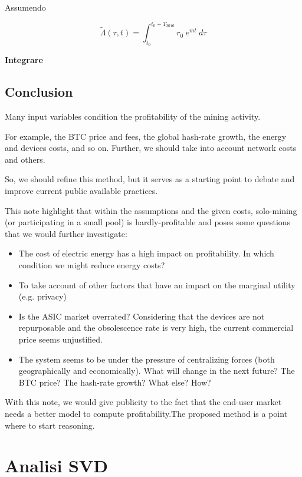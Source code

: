 \documentclass{book}
\theoremstyle{definition}
\begin{document}
Assumendo

\begin{equation}
    \tilde{\Lambda}(\tau, t) = \int_{t_{0}}^{t_{0} + T_{2016}} r_{0} \ e^{m t} \ d\tau
\end{equation}

\textbf{Integrare}

\newpage

\section{Conclusion}

Many input variables condition the profitability of the mining activity.

For example, the BTC price and fees, the global hash-rate growth, the energy and devices costs, and so on. Further, we should take into account network costs and others.

So, we should refine this method, but it serves as a starting point to debate and improve current public available practices.

This note highlight that within the assumptions and the given costs, solo-mining (or participating in a small pool) is hardly-profitable and poses some questions that we would further investigate:


\begin{itemize}
    \item The cost of electric energy has a high impact on profitability. In which condition we might reduce energy costs?
    \item To take account of other factors that have an impact on the marginal utility (e.g. privacy)
    \item Is the ASIC market overrated? Considering that the devices are not repurposable and the obsolescence rate is very high, the current commercial price seems unjustified.
    \item The system seems to be under the pressure of centralizing forces (both geographically and economically). What will change in the next future? The BTC price? The hash-rate growth? What else? How?
\end{itemize}

With this note, we would give publicity to the fact that the end-user market needs a better model to compute profitability.The proposed method is a point where to start reasoning.

\chapter{Analisi SVD}
\end{document}
